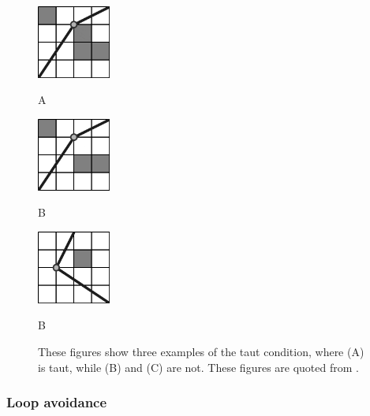 \documentclass[letterpaper, 10 pt, journal, twoside]{IEEEtran}
\begin{document}
\begin{figure}[t]
\begin{minipage}{.32\linewidth}
  \centerline{\includegraphics[width=2.4cm, cframe=gray .2mm]{taut_a.png}}
  \centerline{A}
\end{minipage}
\hfill
\begin{minipage}{.32\linewidth}
  \centerline{\includegraphics[width=2.4cm, cframe=gray .2mm]{taut_b.png}}
  \centerline{B}
\end{minipage}
\hfill
\begin{minipage}{.32\linewidth}
  \centerline{\includegraphics[width=2.4cm, cframe=gray .2mm]{taut_c.png}}
  \centerline{B}
\end{minipage}
\vfill
\caption{These figures show three examples of the taut condition, where (A) is taut, while (B) and (C) are not. These figures are quoted from \cite{oh2017edge}.
}
\label{taut_condition}
\end{figure}
   
\subsubsection{Loop avoidance}
\end{document}
